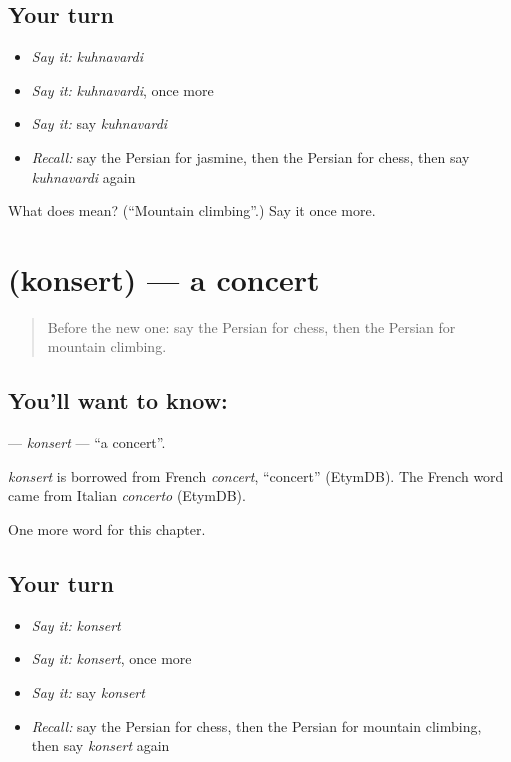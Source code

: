 \subsection*{Your turn}
\begin{itemize}
\raggedright
  \item \emph{Say it:} \emph{kuhnavardi}
  \item \emph{Say it:} \emph{kuhnavardi}, once more
  \item \emph{Say it:} say \emph{kuhnavardi}
  \item \emph{Recall:} say the Persian for jasmine, then the Persian for chess, then say \emph{kuhnavardi} again
\end{itemize}

\begin{tcolorbox}[breakable,colback=teal!4,colframe=teal!35!black,title={Before you move on}]
What does  mean? (\textquotedblleft{}Mountain climbing\textquotedblright{}.) Say it once more.
\end{tcolorbox}
\section[\texorpdfstring{\fa{کنسرت} (konsert)}{کنسرت (konsert)}]{ (konsert) — a concert}

\label{lesson:FA-C280-konsert}



\begin{quote}
Before the new one: say the Persian for chess, then the Persian for mountain climbing.
\end{quote}

\subsection*{You'll want to know: }
\textbf{} — \emph{konsert} — \textquotedblleft{}a concert\textquotedblright{}.

\begin{cousinweb}
\emph{konsert} is borrowed from French \emph{concert}, \textquotedblleft{}concert\textquotedblright{} (EtymDB). The French word came from Italian \emph{concerto} (EtymDB).
\end{cousinweb}

\begin{grammarlens}[title={What you've built}]
One more word for this chapter.
\end{grammarlens}

\subsection*{Your turn}
\begin{itemize}
\raggedright
  \item \emph{Say it:} \emph{konsert}
  \item \emph{Say it:} \emph{konsert}, once more
  \item \emph{Say it:} say \emph{konsert}
  \item \emph{Recall:} say the Persian for chess, then the Persian for mountain climbing, then say \emph{konsert} again
\end{itemize}


